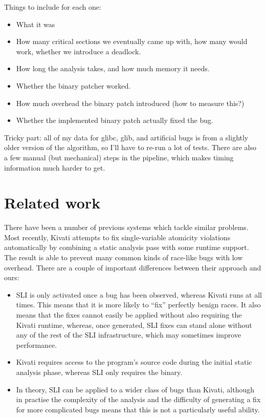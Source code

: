 \documentclass[10pt,a4paper,twocolumn]{article}
\begin{document}
Things to include for each one:

\begin{itemize}
\item What it was
\item How many critical sections we eventually came up with, how many
  would work, whether we introduce a deadlock.
\item How long the analysis takes, and how much memory it needs.
\item Whether the binary patcher worked.
\item How much overhead the binary patch introduced (how to measure this?)
\item Whether the implemented binary patch actually fixed the bug.
\end{itemize}

Tricky part: all of my data for glibc, glib, and artificial bugs is
from a slightly older version of the algorithm, so I'll have to re-run
a lot of tests.  There are also a few manual (but mechanical) steps in
the pipeline, which makes timing information much harder to get.

\section{Related work}

There have been a number of previous systems which tackle similar
problems.  Most recently, Kivati\cite{Chew2010a} attempts to fix
single-variable atomicity violations automatically by combining a
static analysis pass with some runtime support.  The result is able to
prevent many common kinds of race-like bugs with low overhead.  There
are a couple of important differences between their approach and ours:

\begin{itemize}
\item SLI is only activated once a bug has been observed, whereas
  Kivati runs at all times.  This means that it is more likely to
  ``fix'' perfectly benign races.  It also means that the fixes cannot
  easily be applied without also requiring the Kivati runtime,
  whereas, once generated, SLI fixes can stand alone without any of
  the rest of the SLI infrastructure, which may sometimes improve
  performance.

\item Kivati requires access to the program's source code during the
  initial static analysis phase, whereas SLI only requires the binary.

\item In theory, SLI can be applied to a wider class of bugs than
  Kivati, although in practise the complexity of the analysis and the
  difficulty of generating a fix for more complicated bugs means that
  this is not a particularly useful ability.
\end{itemize}
\end{document}
